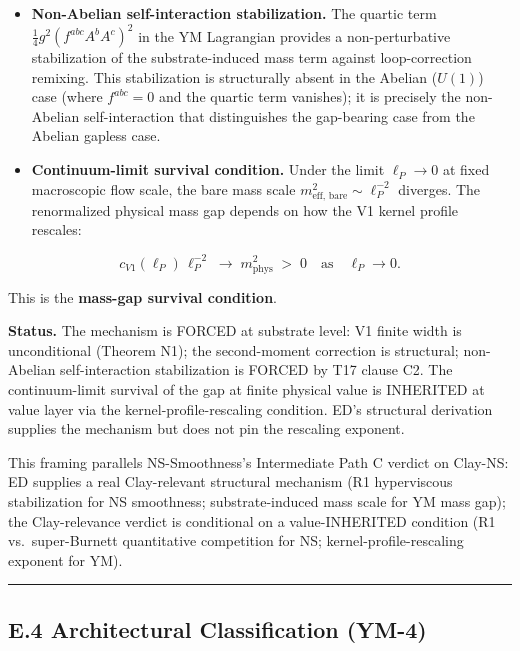\documentclass[
  11pt,a4paper]{article}
\providecommand{\tightlist}{%
  \setlength{\itemsep}{0pt}\setlength{\parskip}{0pt}}
\begin{document}
\begin{itemize}
\tightlist
\item
  \textbf{Non-Abelian self-interaction stabilization.} The quartic term
  \(\tfrac{1}{4}g^2(f^{abc}A^b A^c)^2\) in the YM Lagrangian provides a
  non-perturbative stabilization of the substrate-induced mass term
  against loop-correction remixing. This stabilization is structurally
  absent in the Abelian (\(U(1)\)) case (where \(f^{abc} = 0\) and the
  quartic term vanishes); it is precisely the non-Abelian
  self-interaction that distinguishes the gap-bearing case from the
  Abelian gapless case.
\item
  \textbf{Continuum-limit survival condition.} Under the limit
  \(\ell_P \to 0\) at fixed macroscopic flow scale, the bare mass scale
  \(m_\mathrm{eff,\,bare}^2 \sim \ell_P^{-2}\) diverges. The
  renormalized physical mass gap depends on how the V1 kernel profile
  rescales:
\end{itemize}

\[\boxed{\;c_{V1}(\ell_P)\,\ell_P^{-2} \;\longrightarrow\; m_\mathrm{phys}^2 \;>\; 0 \quad\text{as}\quad \ell_P \to 0.\;}\]

This is the \textbf{mass-gap survival condition}.

\textbf{Status.} The mechanism is FORCED at substrate level: V1 finite
width is unconditional (Theorem N1); the second-moment correction is
structural; non-Abelian self-interaction stabilization is FORCED by T17
clause C2. The continuum-limit survival of the gap at finite physical
value is INHERITED at value layer via the kernel-profile-rescaling
condition. ED's structural derivation supplies the mechanism but does
not pin the rescaling exponent.

This framing parallels NS-Smoothness's Intermediate Path C verdict on
Clay-NS: ED supplies a real Clay-relevant structural mechanism (R1
hyperviscous stabilization for NS smoothness; substrate-induced mass
scale for YM mass gap); the Clay-relevance verdict is conditional on a
value-INHERITED condition (R1 vs.~super-Burnett quantitative competition
for NS; kernel-profile-rescaling exponent for YM).

\begin{center}\rule{0.5\linewidth}{0.5pt}\end{center}

\subsection{E.4 Architectural Classification
(YM-4)}\label{e.4-architectural-classification-ym-4}
\end{document}
